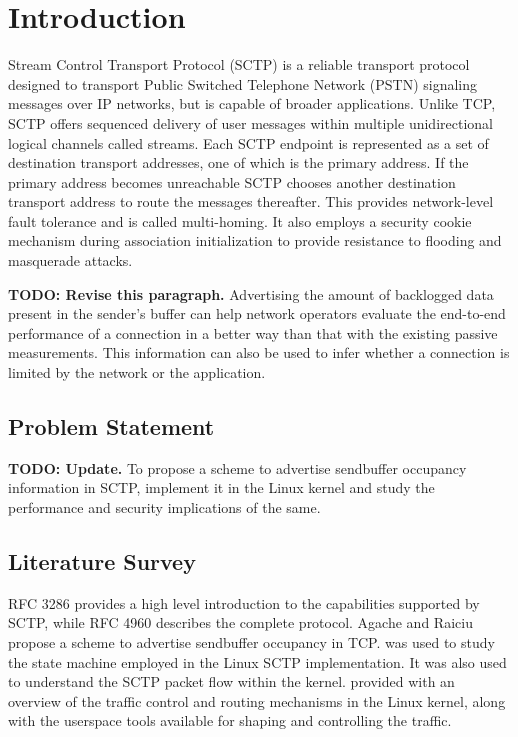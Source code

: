 \chapter{Introduction}
Stream Control Transport Protocol (SCTP) is a reliable transport protocol
designed to transport Public Switched Telephone Network (PSTN) signaling
messages over IP networks, but is capable of broader applications.
Unlike TCP, SCTP offers sequenced delivery of user messages within multiple
unidirectional logical channels called streams.
Each SCTP endpoint is represented as a set of destination transport addresses,
one of which is the primary address. If the primary address becomes unreachable
SCTP chooses another destination transport address to route the messages
thereafter. This provides network-level fault tolerance and is called
multi-homing.
It also employs a security cookie mechanism during association initialization
to provide resistance to flooding and masquerade attacks.

\textbf{TODO: Revise this paragraph.}
Advertising the amount of backlogged data present in the sender's buffer can
help network operators evaluate the end-to-end performance of a connection
in a better way than that with the existing passive measurements.
This information can also be used to infer whether a connection is limited
by the network or the application.

\section{Problem Statement}
\textbf{TODO: Update.}
To propose a scheme to advertise sendbuffer occupancy information in SCTP,
implement it in the Linux kernel and study the performance and security
implications of the same.

\section{Literature Survey}
RFC 3286 \cite{rfc3286} provides a high level introduction to the capabilities
supported by SCTP, while RFC 4960 \cite{rfc4960} describes the complete
protocol. Agache and Raiciu \cite{tcp-sndbufadv} propose a scheme to advertise
sendbuffer occupancy in TCP. \cite{budigerelinux} was used to study the state
machine employed in the Linux SCTP implementation. It was also used to
understand the SCTP packet flow within the kernel. \cite{lartc} provided with
an overview of the traffic control and routing mechanisms in the Linux kernel,
along with the userspace tools available for shaping and controlling the
traffic.
